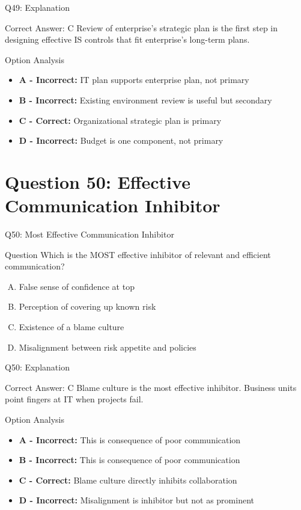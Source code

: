 \documentclass{beamer}
\begin{document}
	\begin{frame}{Q49: Explanation}
		\begin{block}{Correct Answer: C}
			Review of enterprise's strategic plan is the first step in designing effective IS controls that fit enterprise's long-term plans.
		\end{block}
		\begin{block}{Option Analysis}
			\begin{itemize}
				\item \textbf{A - Incorrect:} IT plan supports enterprise plan, not primary
				\item \textbf{B - Incorrect:} Existing environment review is useful but secondary
				\item \textbf{C - Correct:} Organizational strategic plan is primary
				\item \textbf{D - Incorrect:} Budget is one component, not primary
			\end{itemize}
		\end{block}
	\end{frame}
	
	\section{Question 50: Effective Communication Inhibitor}
	
	\begin{frame}{Q50: Most Effective Communication Inhibitor}
		\begin{block}{Question}
			Which is the MOST effective inhibitor of relevant and efficient communication?
		\end{block}
		\begin{enumerate}[(A)]
			\item False sense of confidence at top
			\item Perception of covering up known risk
			\item Existence of a blame culture
			\item Misalignment between risk appetite and policies
		\end{enumerate}
	\end{frame}
	
	\begin{frame}{Q50: Explanation}
		\begin{block}{Correct Answer: C}
			Blame culture is the most effective inhibitor. Business units point fingers at IT when projects fail.
		\end{block}
		\begin{block}{Option Analysis}
			\begin{itemize}
				\item \textbf{A - Incorrect:} This is consequence of poor communication
				\item \textbf{B - Incorrect:} This is consequence of poor communication
				\item \textbf{C - Correct:} Blame culture directly inhibits collaboration
				\item \textbf{D - Incorrect:} Misalignment is inhibitor but not as prominent
			\end{itemize}
		\end{block}
	\end{frame}
	
\end{document}
